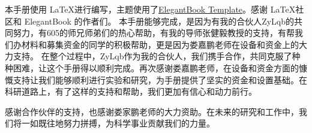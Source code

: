 \documentclass[lang=cn,10pt]{elegantbook}
\begin{document}
本手册使用 \LaTeX 进行编写，主题使用了\href{https://www.overleaf.com/latex/templates/elegantbook-template/zpsrbmdsxrgy}{ElegantBook Template}。感谢 \LaTeX 社区和 ElegantBook 的作者们。
本手册能够完成，是因为有我的合伙人ZyLqb的共同努力，有605的师兄师弟们的热心帮助，有我的导师张健毅教授的支持，有帮我们办材料和募集资金的同学的积极帮助，更是因为娄嘉鹏老师在设备和资金上的大力支持。
在整个过程中，ZyLqb作为我的合伙人，我们携手合作，共同克服了种种困难，让这个手册得以顺利完成。再次感谢娄嘉鹏老师，在设备和资金方面的慷慨支持让我们能够顺利进行实验和研究，为手册提供了坚实的资金和设置基础。在科研道路上，有了这样的支持和帮助，我们更加有信心和动力前行。

感谢合作伙伴的支持，也感谢娄家鹏老师的大力资助。在未来的研究和工作中，我们将一如既往地努力拼搏，为科学事业贡献我们的力量。
\end{document}
